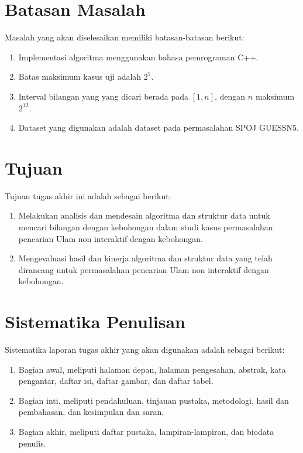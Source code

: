 \section {Batasan Masalah}
Masalah yang akan diselesaikan memiliki batasan-batasan berikut:

\begin {enumerate}
  \item Implementasi algoritma menggunakan bahasa pemrograman C++.
  \item Batas maksimum kasus uji adalah $2^7$.
  \item Interval bilangan yang yang dicari berada pada $[1,n]$, dengan $n$ maksimum $2^12$.
  \item Dataset yang digunakan adalah dataset pada permasalahan SPOJ GUESSN5.
\end {enumerate}

\section {Tujuan}
Tujuan tugas akhir ini adalah sebagai berikut:

\begin{enumerate}
  \item Melakukan analisis dan mendesain algoritma dan struktur data untuk mencari bilangan dengan kebohongan dalam studi kasus permasalahan pencarian Ulam non interaktif dengan kebohongan.
  \item Mengevaluasi hasil dan kinerja algoritma dan struktur data yang telah dirancang untuk permasalahan pencarian Ulam non interaktif dengan kebohongan.
\end{enumerate}

\section {Sistematika Penulisan}
Sistematika laporan tugas akhir yang akan digunakan adalah sebagai berikut:

\begin{enumerate}
\item Bagian awal, meliputi halaman depan, halaman pengesahan, abstrak, kata pengantar, daftar isi, daftar gambar, dan daftar tabel.
\item Bagian inti, meliputi pendahuluan, tinjauan pustaka, metodologi, hasil dan pembahasan, dan kesimpulan dan saran.
\item Bagian akhir, meliputi daftar pustaka, lampiran-lampiran, dan biodata penulis.
\end{enumerate}